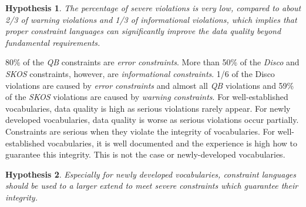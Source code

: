 \documentclass{llncs}
\newtheorem{hyp}{Hypothesis}
\begin{document}
{{\begin{hyp}
The percentage of severe violations is very low, compared to about 2/3 of warning violations and 1/3 of informational violations, which implies that proper constraint languages can significantly improve the data quality beyond fundamental requirements.
\end{hyp} 

80\% of the \emph{QB} constraints are \emph{error constraints}.
More than 50\% of the \emph{Disco} and \emph{SKOS} constraints, however, are \emph{informational constraints}.
1/6 of the Disco violations are caused by \emph{error constraints} and
almost all \emph{QB} violations and 59\% of the \emph{SKOS} violations are caused by \emph{warning constraints}.  
For well-established vocabularies, data quality is high
as serious violations rarely appear.
For newly developed vocabularies, data quality is worse
as serious violations occur partially.
Constraints are serious when they violate the integrity of vocabularies.
For well-established vocabularies, it is well documented and the experience is high how to guarantee this integrity.
This is not the case or newly-developed vocabularies.
\begin{hyp}
Especially for newly developed vocabularies, constraint languages should be used to a larger extend to meet severe constraints which guarantee their integrity.   
\end{hyp} 


}}
\end{document}
